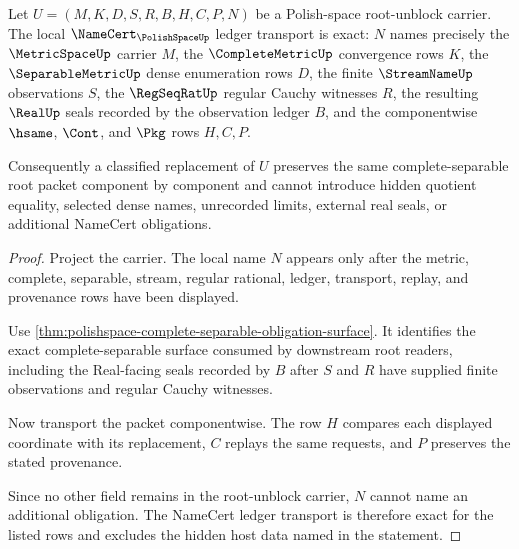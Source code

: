 \begin{theorem}
\label{thm:polishspace-namecert-ledger-exactness}
Let $U=(M,K,D,S,R,B,H,C,P,N)$ be a Polish-space root-unblock carrier. The local $\NameCert_{\PolishSpaceUp}$ ledger transport is exact: $N$ names precisely the $\MetricSpaceUp$ carrier $M$, the $\CompleteMetricUp$ convergence rows $K$, the $\SeparableMetricUp$ dense enumeration rows $D$, the finite $\StreamNameUp$ observations $S$, the $\RegSeqRatUp$ regular Cauchy witnesses $R$, the resulting $\RealUp$ seals recorded by the observation ledger $B$, and the componentwise $\hsame$, $\Cont$, and $\Pkg$ rows $H,C,P$.

Consequently a classified replacement of $U$ preserves the same complete-separable root packet component by component and cannot introduce hidden quotient equality, selected dense names, unrecorded limits, external real seals, or additional NameCert obligations.
\end{theorem}
\begin{proof}
Project the carrier. The local name $N$ appears only after the metric, complete, separable, stream, regular rational, ledger, transport, replay, and provenance rows have been displayed.

Use \autoref{thm:polishspace-complete-separable-obligation-surface}. It identifies the exact complete-separable surface consumed by downstream root readers, including the Real-facing seals recorded by $B$ after $S$ and $R$ have supplied finite observations and regular Cauchy witnesses.

Now transport the packet componentwise. The row $H$ compares each displayed coordinate with its replacement, $C$ replays the same requests, and $P$ preserves the stated provenance.

Since no other field remains in the root-unblock carrier, $N$ cannot name an additional obligation. The NameCert ledger transport is therefore exact for the listed rows and excludes the hidden host data named in the statement.
\end{proof}

